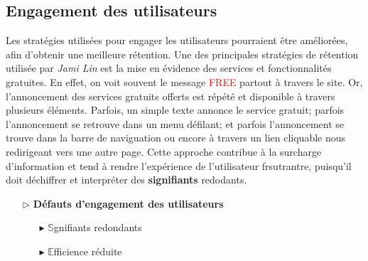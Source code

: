 \documentclass[9pt]{report}
\newcommand{\mathpazott}{\fontfamily{pplj}\selectfont}
\renewcommand{\texttt}[1]{{\scriptsize\mathpazott #1}}
\begin{document}
\begin{multicols*}{2}
  \subsection{Engagement des utilisateurs}
  Les stratégies utilisées pour engager les utilisateurs pourraient 
  être améliorées, afin d'obtenir une meilleure rétention. Une des  
  principales stratégies de rétention utilisée par \textit{\textit{Jami Lin}} 
  est la mise en évidence des services et fonctionnalités gratuites. 
  En effet, on voit souvent le message \texttt{\textcolor{red}{FREE}} 
  partout à travers le site. Or, l'annoncement des services gratuits 
  offerts est répété et disponible à travers plusieurs éléments. Parfois, 
  un simple texte annonce le service gratuit; parfois l'annoncement 
  se retrouve dans un menu défilant; et parfois l'annoncement se trouve 
  dans la barre de naviguation ou encore à travers un lien cliquable nous 
  redirigeant vers une autre page. Cette approche 
  contribue à la surcharge d'information et tend à rendre 
  l'expérience de l'utilisateur frsutrantre, puisqu'il doit 
  déchiffrer et interpréter des \textbf{signifiants}  redodants. 


  \begin{itemize}
    \item [$\rhd$ ] \textbf{Défauts d'engagement des utilisateurs}  
      \begin{itemize}
        \item [$\blacktriangleright$ ] $\mathbb{S}$gnifiants redondants
        \item [$\blacktriangleright$ ] $\mathbb{E}$fficience réduite
      \end{itemize}
  \end{itemize}


\end{multicols*}
\end{document}
